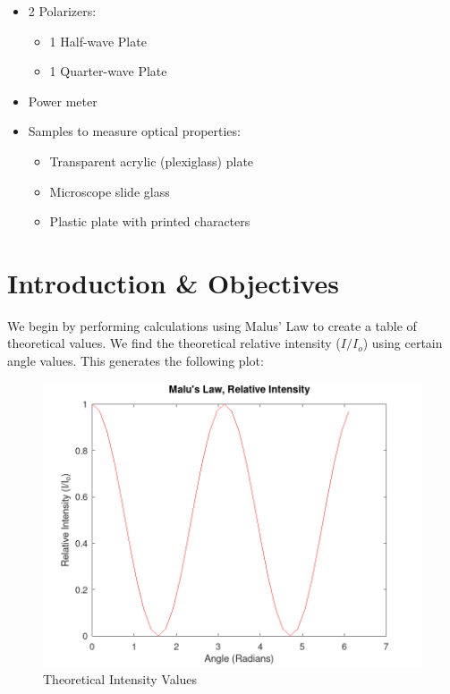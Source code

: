 \documentclass[
	letterpaper, %
	10pt, %
]{CSUniSchoolLabReport}
\begin{document}
\begin{itemize}

  \item 2 Polarizers:

    \begin{itemize}

      \item 1 Half-wave Plate

      \item 1 Quarter-wave Plate

    \end{itemize}

  \item Power meter

  \item Samples to measure optical properties:

    \begin{itemize}

      \item Transparent acrylic (plexiglass) plate

      \item Microscope slide glass

      \item Plastic plate with printed characters

    \end{itemize}

\end{itemize}

\section{Introduction \& Objectives}

We begin by performing calculations using Malus' Law to create a table of theoretical values. We find the theoretical relative intensity ($I/I_o$) using certain angle values. This generates the following plot:

\begin{figure}[h!]
  \centering
  \includegraphics[width=.9\textwidth]{Figures/Lab Eight/MaluTheor.png}
  \caption{Theoretical Intensity Values}
  \label{fig:1}
\end{figure}
\end{document}
